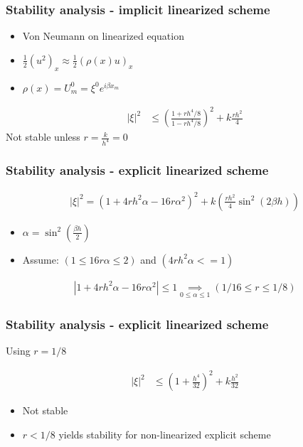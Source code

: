 \documentclass[screen]{beamer}
\begin{document}
\begin{frame}

\frametitle{Stability analysis - implicit linearized scheme}
\begin{itemize}
\item Von Neumann on linearized equation \\
\item $\frac{1}{2}(u^2)_x \approx \frac{1}{2}(\rho(x)u)_x$ \\
\item $\rho(x) = U^0_m = \xi^0 e^{i\beta x_m}$ 
\end{itemize}


\begin{align*}
|\xi |^2 &\le \left(\frac{1+rh^4/8}{1-rh^4/8}\right)^2 + k\frac{rh^2}{4}
\end{align*}
Not stable unless $r = \frac{k}{h^4}= 0$

\end{frame}


\begin{frame}
\frametitle{Stability analysis - explicit linearized scheme}
\begin{align*}
|\xi |^2 =  \left(1+4rh^2\alpha-16r\alpha^2\right)^2 + k\left(\frac{rh^2}{4}\sin^2(2\beta h)\right)
\end{align*}

\begin{itemize}
\item $\alpha = \sin^2(\frac{\beta h}{2})$
\item Assume: $(1 \le 16r\alpha \le 2)$ and $(4rh^2\alpha <= 1)$
\end{itemize}

\begin{align*}
 \left| 1+4rh^2\alpha -16r\alpha^2\right| \le 1 \underset{0\le \alpha\le 1}{\implies} \left(1/16 \le r \le 1/8 \right)
\end{align*} 

\end{frame}

\begin{frame}
\frametitle{Stability analysis - explicit linearized scheme}

Using $r = 1/8$ 

\begin{align*}
|\xi |^2 &\le \left(1 + \frac{h^4}{32}\right)^2 + k\frac{h^2}{32} 
\end{align*}

\begin{itemize}
\item Not stable
\item $r < 1/8$ yields stability for non-linearized explicit scheme
\end{itemize}
\end{frame}
\end{document}
